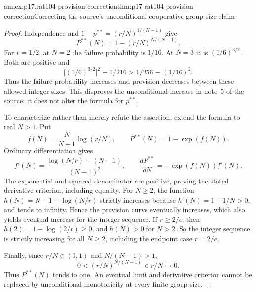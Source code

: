 \begin{annexitem}{annex:p17.rat104-provision-correction}{thm:p17-rat104-provision-correction}{Correcting the source's unconditional cooperative group-size claim}
\begin{proof}
Independence and \(1-p^{**}=(r/N)^{1/(N-1)}\) give
\[
              P^{**}(N)=1-(r/N)^{N/(N-1)}.
\]
For \(r=1/2\), at \(N=2\) the failure probability is \(1/16\).
At \(N=3\) it is \((1/6)^{3/2}\). Both are positive and
\[
       \bigl[(1/6)^{3/2}\bigr]^2=1/216>1/256=(1/16)^2.
\]
Thus the failure probability increases and provision decreases between
these allowed integer sizes. This disproves the unconditional increase
in note~5 of the source; it does not alter the formula for \(p^{**}\).

To characterize rather than merely refute the assertion, extend the
formula to real \(N>1\). Put
\[
 f(N)=\frac{N}{N-1}\log(r/N),\qquad P^{**}(N)=1-\exp(f(N)).
\]
Ordinary differentiation gives
\[
 f'(N)=\frac{\log(N/r)-(N-1)}{(N-1)^2},\qquad
 \frac{dP^{**}}{dN}=-\exp(f(N))f'(N).
\]
The exponential and squared denominator are positive, proving the stated
derivative criterion, including equality. For \(N\geq2\), the function
\(h(N)=N-1-\log(N/r)\) strictly increases because
\(h'(N)=1-1/N>0\), and tends to infinity. Hence the provision curve
eventually increases, which also yields eventual increase for the integer
sequence. If \(r\geq2/e\), then
\(h(2)=1-\log(2/r)\geq0\), and \(h(N)>0\) for \(N>2\).
So the integer sequence is strictly increasing for all \(N\geq2\),
including the endpoint case \(r=2/e\).

Finally, since \(r/N\in(0,1)\) and \(N/(N-1)>1\),
\[
              0<(r/N)^{N/(N-1)}<r/N\longrightarrow0.
\]
Thus \(P^{**}(N)\) tends to one. An eventual limit and derivative
criterion cannot be replaced by unconditional monotonicity at every finite
group size.
\end{proof}
\end{annexitem}
